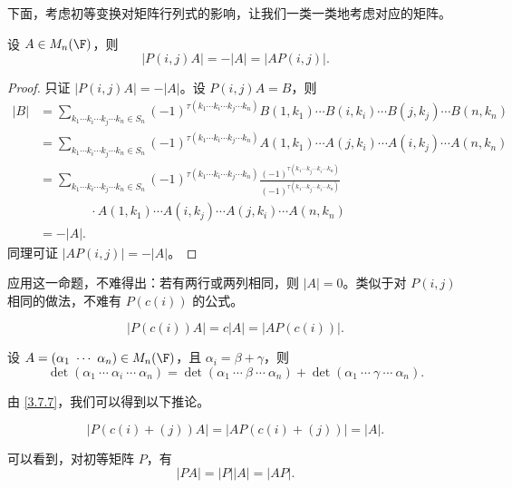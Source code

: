 下面，考虑初等变换对矩阵行列式的影响，让我们一类一类地考虑对应的矩阵。

\begin{proposition}\label{3.7.5}
	设 $A\in M_n(\F)$，则
	\[
	|P(i,j)A|=-|A|=|AP(i,j)|.
	\]
\end{proposition}

\begin{proof}
	只证 $|P(i,j)A|=-|A|$。设 $P(i,j)A=B$，则
	\[
	\begin{aligned}
		|B|
		&=\sum_{k_1\cdots k_i\cdots k_j\cdots k_n\in S_n}
		(-1)^{\tau(k_1\cdots k_i\cdots k_j\cdots k_n)}
		B(1,k_1)\cdots B(i,k_i)\cdots B(j,k_j)\cdots B(n,k_n)\\
		&=\sum_{k_1\cdots k_i\cdots k_j\cdots k_n\in S_n}
		(-1)^{\tau(k_1\cdots k_i\cdots k_j\cdots k_n)}
		A(1,k_1)\cdots A(j,k_i)\cdots A(i,k_j)\cdots A(n,k_n)\\
		&=\sum_{k_1\cdots k_i\cdots k_j\cdots k_n\in S_n}
		(-1)^{\tau(k_1\cdots k_i\cdots k_j\cdots k_n)}
		\frac{(-1)^{\tau(k_1\cdots k_j\cdots k_i\cdots k_n)}}
		{(-1)^{\tau(k_1\cdots k_j\cdots k_i\cdots k_n)}}\\
		&\qquad\qquad\cdot
		A(1,k_1)\cdots A(i,k_j)\cdots A(j,k_i)\cdots A(n,k_n)\\
		&=-|A|.
	\end{aligned}
	\]
	同理可证 $|AP(i,j)|=-|A|$。
\end{proof}

应用这一命题，不难得出：若有两行或两列相同，则 $|A|=0$。类似于对 $P(i,j)$ 相同的做法，不难有 $P(c(i))$ 的公式。

\begin{proposition}\label{3.7.6}
	\[
	|P(c(i))A|=c|A|=|AP(c(i))|.
	\]
\end{proposition}

\begin{proposition}\label{3.7.7}
	设 $A=(\alpha_1\ \cdots\ \alpha_n)\in M_n(\F)$，且 $\alpha_i=\beta+\gamma$，则
	\[
	\det(\alpha_1\ \cdots\ \alpha_i\ \cdots\ \alpha_n)
	=
	\det(\alpha_1\ \cdots\ \beta\ \cdots\ \alpha_n)
	+
	\det(\alpha_1\ \cdots\ \gamma\ \cdots\ \alpha_n).
	\]
\end{proposition}

由 \ref{3.7.7}，我们可以得到以下推论。

\begin{corollary}\label{3.7.8}
	\[
	|P(c(i)+(j))A|=|AP(c(i)+(j))|=|A|.
	\]
\end{corollary}

可以看到，对初等矩阵 $P$，有
\[
|PA|=|P||A|=|AP|.
\]

